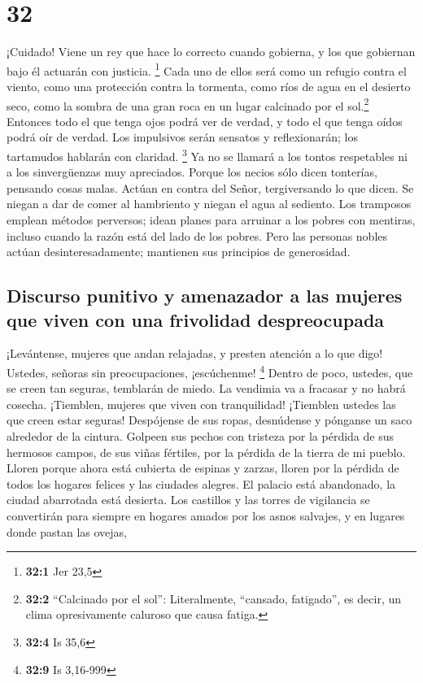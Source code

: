 \hypertarget{section-31}{%
\section{32}\label{section-31}}

 ¡Cuidado! Viene un rey que hace lo correcto cuando
gobierna, y los que gobiernan bajo él actuarán con justicia. \footnote{\textbf{32:1}
  Jer 23,5}  Cada uno de ellos será como un refugio contra
el viento, como una protección contra la tormenta, como ríos de agua en
el desierto seco, como la sombra de una gran roca en un lugar calcinado
por el sol.\footnote{\textbf{32:2} ``Calcinado por el sol'':
  Literalmente, ``cansado, fatigado'', es decir, un clima opresivamente
  caluroso que causa fatiga.}  Entonces todo el que tenga
ojos podrá ver de verdad, y todo el que tenga oídos podrá oír de verdad.
 Los impulsivos serán sensatos y reflexionarán; los
tartamudos hablarán con claridad. \footnote{\textbf{32:4} Is 35,6}
 Ya no se llamará a los tontos respetables ni a los
sinvergüenzas muy apreciados.  Porque los necios sólo
dicen tonterías, pensando cosas malas. Actúan en contra del Señor,
tergiversando lo que dicen. Se niegan a dar de comer al hambriento y
niegan el agua al sediento.  Los tramposos emplean métodos
perversos; idean planes para arruinar a los pobres con mentiras, incluso
cuando la razón está del lado de los pobres.  Pero las
personas nobles actúan desinteresadamente; mantienen sus principios de
generosidad.

\hypertarget{discurso-punitivo-y-amenazador-a-las-mujeres-que-viven-con-una-frivolidad-despreocupada}{%
\subsection{Discurso punitivo y amenazador a las mujeres que viven con
una frivolidad
despreocupada}\label{discurso-punitivo-y-amenazador-a-las-mujeres-que-viven-con-una-frivolidad-despreocupada}}

 ¡Levántense, mujeres que andan relajadas, y presten
atención a lo que digo! Ustedes, señoras sin preocupaciones,
¡escúchenme! \footnote{\textbf{32:9} Is 3,16-999}  Dentro
de poco, ustedes, que se creen tan seguras, temblarán de miedo. La
vendimia va a fracasar y no habrá cosecha.  ¡Tiemblen,
mujeres que viven con tranquilidad! ¡Tiemblen ustedes las que creen
estar seguras! Despójense de sus ropas, desnúdense y pónganse un saco
alrededor de la cintura.  Golpeen sus pechos con tristeza
por la pérdida de sus hermosos campos, de sus viñas fértiles,
 por la pérdida de la tierra de mi pueblo. Lloren porque
ahora está cubierta de espinas y zarzas, lloren por la pérdida de todos
los hogares felices y las ciudades alegres.  El palacio
está abandonado, la ciudad abarrotada está desierta. Los castillos y las
torres de vigilancia se convertirán para siempre en hogares amados por
los asnos salvajes, y en lugares donde pastan las ovejas,

